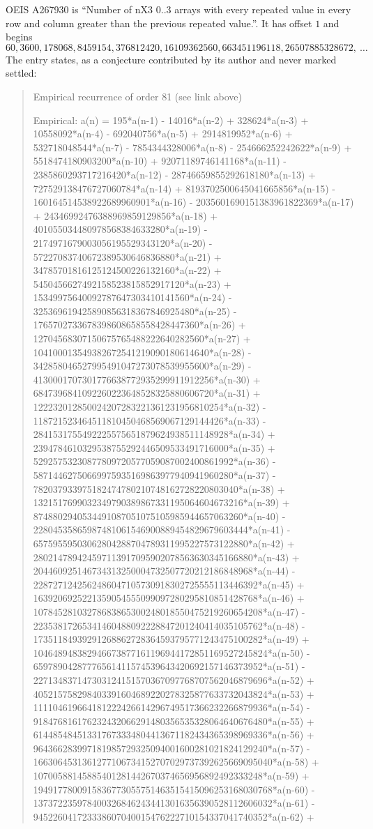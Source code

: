 \documentclass[11pt,a4paper]{article}
\theoremstyle{plain}
\theoremstyle{definition}
\begin{document}
OEIS A267930 is ``Number of nX3 0..3 arrays with every repeated value in every row and column greater than the previous repeated value.''. It has offset $1$ and begins
\[
60, 3600, 178068, 8459154, 376812420, 16109362560, 663451196118, 26507885328672,\ \dots
\]
The entry states, as a conjecture contributed by its author and never marked settled:
\begin{quote}
Empirical recurrence of order 81 (see link above)

Empirical: a(n) = 195*a(n-1) - 14016*a(n-2) + 328624*a(n-3) + 10558092*a(n-4) - 692040756*a(n-5) + 2914819952*a(n-6) + 532718048544*a(n-7) - 7854344328006*a(n-8) - 254666252242622*a(n-9) + 5518474180903200*a(n-10) + 92071189746141168*a(n-11) - 2385860293717216420*a(n-12) - 28746659855292618180*a(n-13) + 727529138476727060784*a(n-14) + 8193702500645041665856*a(n-15) - 160164514538922689960901*a(n-16) - 2035601690151383961822369*a(n-17) + 24346992476388969859129856*a(n-18) + 401055034480978568384633280*a(n-19) - 2174971679003056195529343120*a(n-20) - 57227083740672389530646836880*a(n-21) + 34785701816125124500226132160*a(n-22) + 5450456627492158523815852917120*a(n-23) + 15349975640092787647303410141560*a(n-24) - 325369619425890856318367846925480*a(n-25) - 1765702733678398608658558428447360*a(n-26) + 12704568307150675765488222640282560*a(n-27) + 104100013549382672541219090180614640*a(n-28) - 342858046527995491047273078539955600*a(n-29) - 4130001707301776638772935299911912256*a(n-30) + 6847396841092260223648528325880606720*a(n-31) + 122232012850024207283221361231956810254*a(n-32) - 118721523464511810450468569067129144426*a(n-33) - 2841531755492225575651879624938511148928*a(n-34) + 2394784610329538755292446509533491716000*a(n-35) + 52925753230877809720577059087002400861992*a(n-36) - 58714462750669975935169863977940941960280*a(n-37) - 782037933975182474780210748162728220803040*a(n-38) + 1321517699032349790389867331195064604673216*a(n-39) + 8748802940534491087051075105985944657063260*a(n-40) - 22804535865987481061546900889454829679603444*a(n-41) - 65759559503062804288704789311995227573122880*a(n-42) + 280214789424597113917095902078563630345166880*a(n-43) + 204460925146734313250004732507720212186848968*a(n-44) - 2287271242562486047105730918302725555113446392*a(n-45) + 1639206925221359054555099097280295810851428768*a(n-46) + 10784528103278683865300248018550475219260654208*a(n-47) - 22353817265341460488092228847201240414035105762*a(n-48) - 17351184939291268862728364593795771243475100282*a(n-49) + 104648948382946673877161196944172851169527245824*a(n-50) - 65978904287776561411574539643420692157146373952*a(n-51) - 227134837147303124151570367097768707562046879696*a(n-52) + 405215758298403391604689220278325877633732043824*a(n-53) + 111104619664181222426614296749517366232266879936*a(n-54) - 918476816176232432066291480356535328064640676480*a(n-55) + 614485484513317673334804413671182434365398969336*a(n-56) + 964366283997181985729325094001600281021824129240*a(n-57) - 1663064531361277106734152707029737392625669095040*a(n-58) + 10700588145885401281442670374656956892492333248*a(n-59) + 1949177800915836773055751463515415096253168030768*a(n-60) - 1373722359784003268462434413016356390528112606032*a(n-61) - 945226041723338607040015476222710154337041740352*a(n-62) + 
\end{quote}
\end{document}
